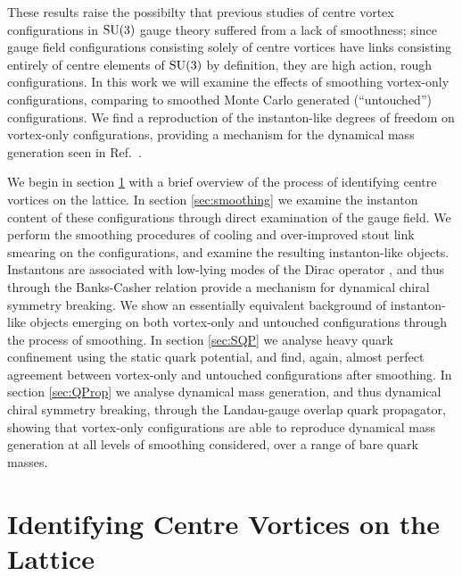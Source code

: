 \documentclass[
 reprint,
 amsmath,amssymb,
 aps,
prd,
]{revtex4-1}
\begin{document}
These results raise the possibilty that previous studies of centre vortex configurations in $\mathrm{SU}(3)$ gauge theory suffered from a lack of smoothness; since gauge field configurations consisting solely of centre vortices have links consisting entirely of centre elements of $\mathrm{SU}(3)$ by definition, they are high action, rough configurations. In this work we will examine the effects of smoothing vortex-only configurations, comparing to smoothed Monte Carlo generated (``untouched'') configurations. We find a reproduction of the instanton-like degrees of freedom on vortex-only configurations, providing a mechanism for the dynamical mass generation seen in Ref.~\cite{Trewartha:2015nna}. \par
We begin in section \ref{sec:VortexIdent} with a brief overview of the process of identifying centre vortices on the lattice. In section \ref{sec:smoothing} we examine the instanton content of these configurations through direct examination of the gauge field. We perform the smoothing procedures of cooling and over-improved stout link smearing on the configurations, and examine the resulting instanton-like objects. Instantons are associated with low-lying modes of the Dirac operator \cite{Ilgenfritz:2008ia}, and thus through the Banks-Casher relation \cite{Banks:1979yr} provide a mechanism for dynamical chiral symmetry breaking. We show an essentially equivalent background of instanton-like objects emerging on both vortex-only and untouched configurations through the process of smoothing. In section \ref{sec:SQP} we analyse heavy quark confinement using the static quark potential, and find, again, almost perfect agreement between vortex-only and untouched configurations after smoothing. In section \ref{sec:QProp} we analyse dynamical mass generation, and thus dynamical chiral symmetry breaking, through the Landau-gauge overlap quark propagator, showing that vortex-only configurations are able to reproduce dynamical mass generation at all levels of smoothing considered, over a range of bare quark masses.


\section{Identifying Centre Vortices on the Lattice}
\label{sec:VortexIdent}
\end{document}
